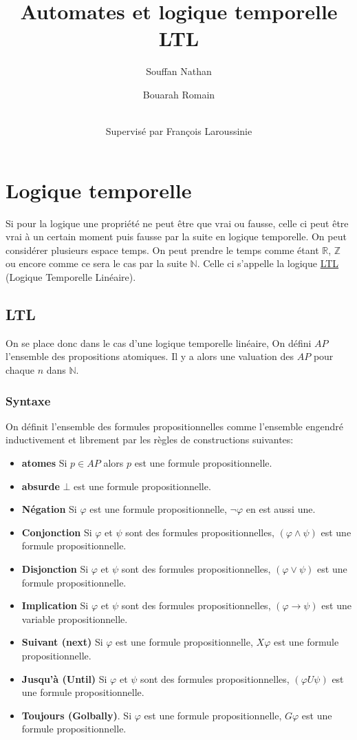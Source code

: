 \documentclass[12pt,a4paper]{article}
\title {Automates et logique temporelle LTL}
\author{
  Souffan Nathan \and
  Bouarah Romain \and
  \\Supervisé par François Laroussinie
}
\theoremstyle{plain}
\theoremstyle{definition}
\begin{document}
\maketitle
\newpage

\section{Logique temporelle}

Si pour la logique une propriété ne peut être que vrai ou fausse, celle ci peut être vrai à un certain moment puis fausse par la suite en logique temporelle. On peut considérer plusieurs espace temps. On peut prendre le temps comme étant $\mathbb{R}$, $\mathbb{Z}$ ou encore comme ce sera le cas par la suite $\mathbb{N}$. Celle ci s'appelle la logique \underline{LTL} (Logique Temporelle Linéaire).

\subsection{LTL}
On se place donc dans le cas d'une logique temporelle linéaire, On défini $AP$ l'ensemble des propositions atomiques. Il y a alors une valuation des $AP$ pour chaque $n$ dans $\mathbb{N}$.

\subsubsection{Syntaxe}
On définit l'ensemble des formules propositionnelles comme l'ensemble engendré inductivement et librement par les règles de constructions suivantes:
\begin{itemize}
	\item[] \textbf{atomes} Si $p \in AP$ alors $p$ est une formule propositionnelle.
	\item[] \textbf{absurde} $\bot$ est une formule propositionnelle.
	\item[] \textbf{Négation} Si $\varphi$ est une formule propositionnelle, $\lnot \varphi$ en est aussi une.
	\item[] \textbf{Conjonction} Si $\varphi$ et $\psi$ sont des formules propositionnelles, $(\varphi\land \psi)$ est une formule propositionnelle.
	\item[] \textbf{Disjonction} Si $\varphi$ et $\psi$ sont des formules propositionnelles, $(\varphi\lor \psi)$ est une formule propositionnelle.
	\item[] \textbf{Implication} Si $\varphi$ et $\psi$ sont des formules propositionnelles, $(\varphi \to \psi)$ est une variable propositionnelle.
	\item[] \textbf{Suivant (next)} Si $\varphi$ est une formule propositionnelle, $X\varphi$ est une formule propositionnelle.
	\item[] \textbf{Jusqu'à (Until)} Si $\varphi$ et $\psi$ sont des formules propositionnelles, $(\varphi U \psi)$ est une formule propositionnelle.
	\item[] \textbf{Toujours (Golbally)}. Si $\varphi$ est une formule propositionnelle, $G\varphi$ est une formule propositionnelle.
\end{itemize}
\end{document}
